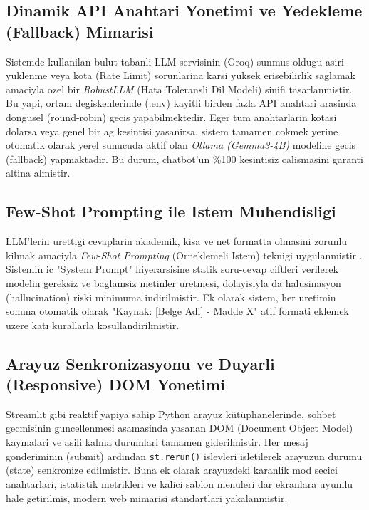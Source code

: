 \documentclass[12pt,a4paper]{report}
\begin{document}
\subsection{Dinamik API Anahtari Yonetimi ve Yedekleme (Fallback) Mimarisi}
Sistemde kullanilan bulut tabanli LLM servisinin (Groq) sunmus oldugu asiri yuklenme veya kota (Rate Limit) sorunlarina karsi yuksek erisebilirlik saglamak amaciyla ozel bir \textit{RobustLLM} (Hata Toleransli Dil Modeli) sinifi tasarlanmistir. Bu yapi, ortam degiskenlerinde (.env) kayitli birden fazla API anahtari arasinda dongusel (round-robin) gecis yapabilmektedir. Eger tum anahtarlarin kotasi dolarsa veya genel bir ag kesintisi yasanirsa, sistem tamamen cokmek yerine otomatik olarak yerel sunucuda aktif olan \textit{Ollama (Gemma3-4B)} modeline gecis (fallback) yapmaktadir. Bu durum, chatbot'un \%100 kesintisiz calismasini garanti altina almistir.

\subsection{Few-Shot Prompting ile Istem Muhendisligi}
LLM'lerin urettigi cevaplarin akademik, kisa ve net formatta olmasini zorunlu kilmak amaciyla \textit{Few-Shot Prompting} (Orneklemeli Istem) teknigi uygulanmistir \cite{brown2020language}. Sistemin ic "System Prompt" hiyerarsisine statik soru-cevap ciftleri verilerek modelin gereksiz ve baglamsiz metinler uretmesi, dolayisiyla da halusinasyon (hallucination) riski minimuma indirilmistir. Ek olarak sistem, her uretimin sonuna otomatik olarak "Kaynak: [Belge Adi] - Madde X" atif formati eklemek uzere katı kurallarla kosullandirilmistir.

\subsection{Arayuz Senkronizasyonu ve Duyarli (Responsive) DOM Yonetimi}
Streamlit gibi reaktif yapiya sahip Python arayuz kütüphanelerinde, sohbet gecmisinin guncellenmesi asamasinda yasanan DOM (Document Object Model) kaymalari ve asili kalma durumlari tamamen giderilmistir. Her mesaj gonderiminin (submit) ardindan \texttt{st.rerun()} islevleri isletilerek arayuzun durumu (state) senkronize edilmistir. Buna ek olarak arayuzdeki karanlik mod secici anahtarlari, istatistik metrikleri ve kalici sablon menuleri dar ekranlara uyumlu hale getirilmis, modern web mimarisi standartlari yakalanmistir.

\end{document}
